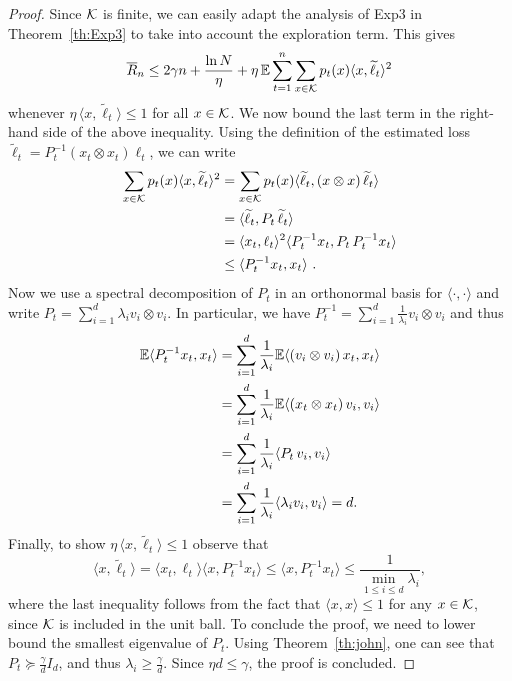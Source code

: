 \begin{proof}
Since $\mathcal{K}$ is finite, we can easily adapt the analysis of Exp3 in Theorem~\ref{th:Exp3} to take into account the exploration term.
This gives
$$\overline{R}_n \leq 2 \gamma n + \frac{\ln N}{\eta} + \eta\,\mathbb{E} \sum_{t=1}^n \sum_{x \in \mathcal{K}} {p}_t(x) \langle x, \widetilde{\ell}_t \rangle^2
$$
whenever
$\eta\,\langle x, \tilde{\ell}_t \rangle \leq 1$ for all $x \in \mathcal{K}$. We now bound the last term in the right-hand side of the above inequality. Using the definition of the estimated loss $\tilde{\ell}_t = P_t^{-1} \left(x_t \otimes x_t\right) \ell_t$, we can write
\begin{align*}
    \sum_{x \in \mathcal{K}} {p}_t(x) \langle x, \widetilde{\ell}_t \rangle^2
&=
    \sum_{x \in \mathcal{K}} {p}_t(x) \langle \widetilde{\ell}_t, (x \otimes x)\,\widetilde{\ell}_t \rangle
\\& =
    \langle \widetilde{\ell}_t, P_t\,\widetilde{\ell}_t \rangle 
\\&=
    \langle x_t, \ell_t \rangle^2 \langle P_t^{-1} x_t, P_t\, P_t^{-1} x_t\rangle
\\ &\le
    \langle P_t^{-1} x_t, x_t \rangle~.
\end{align*}
Now we use a spectral decomposition of $P_t$ in an orthonormal basis for $\langle \cdot, \cdot \rangle$ and write
$P_t = \sum_{i=1}^d \lambda_i v_i \otimes v_i $. In particular, we have $P_t^{-1} = \sum_{i=1}^d \frac{1}{\lambda_i} v_i \otimes v_i$ and thus
\begin{align*}
\mathbb{E} \langle P_t^{-1} x_t, x_t \rangle & = \sum_{i=1}^d \frac{1}{\lambda_i} \mathbb{E} \langle (v_i \otimes v_i)\, x_t, x_t \rangle \\
& = \sum_{i=1}^d \frac{1}{\lambda_i} \mathbb{E} \langle (x_t \otimes x_t)\, v_i, v_i \rangle \\
& = \sum_{i=1}^d \frac{1}{\lambda_i} \langle P_t\, v_i, v_i \rangle \\
& =  \sum_{i=1}^d \frac{1}{\lambda_i} \langle \lambda_i v_i, v_i \rangle
 =  d.
\end{align*}
Finally, to show $\eta\,\langle x, \tilde{\ell}_t \rangle \le 1$ observe that
$$
\langle x, \tilde{\ell}_t \rangle  =  \langle x_t, \ell_t \rangle \langle x, P_t^{-1} x_t \rangle
 \leq  \langle x, P_t^{-1} x_t \rangle
 \leq  \frac{1}{\min_{1 \leq i \leq d} \lambda_i} ,$$
where the last inequality follows from the fact that $\langle x, x \rangle \leq 1$ for any $x \in \mathcal{K}$, since $\mathcal{K}$ is included in the unit ball. To conclude the proof, we need to lower bound the smallest eigenvalue of $P_t$. Using Theorem~\ref{th:john}, one can see that $P_t \succeq \frac{\gamma}{d} I_d$, and thus $\lambda_i \geq \frac{\gamma}{d}$. Since ${\eta d} \le {\gamma}$, the proof is concluded.
\end{proof}


